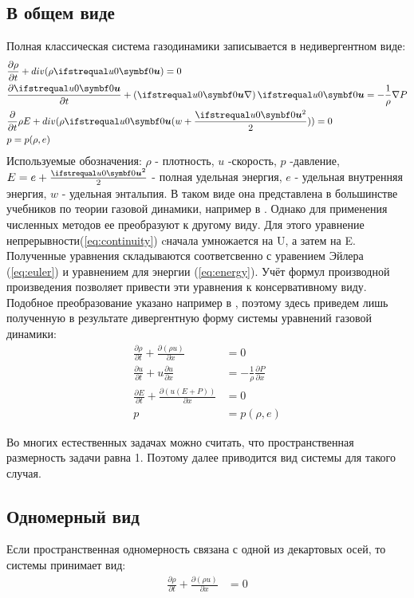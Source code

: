 \documentclass[a4paper,12pt]{extarticle}
\begin{document}
\subsection{В общем виде}
    Полная классическая система газодинамики записывается в недивергентном виде:
    \begin{align} 
        &\frac{\partial \rho}{\partial t} + div(\rho \vecxu) = 0 \label{eq:continuity}\\
        &\frac{\partial \vecxu}{\partial t} + \left(\vecxu \nabla \right)\vecxu = -\frac{1}{\rho}\nabla P  \label{eq:euler}	\\
        &\frac{\partial }{\partial t}\rho E + div(\rho \vecxu (w+\frac{\vecxu^2}{2})) = 0  \label{eq:energy} \\
        &p = p(\rho,e)
    \end{align}
    Используемые обозначения: $\rho$ - плотность, $u$ -скорость, $p$ -давление, $E = e + \frac{\vecxu^2}{2}$ - полная удельная энергия, $e$ - удельная внутренняя энергия, $w$ - удельная энтальпия.
    В таком виде она представлена в большинстве учебников по теории газовой динамики, например в \cite{godunov1976}. 
    Однако для применения численных методов ее преобразуют к другому виду. Для этого уравнение непрерывности(\ref{eq:continuity}) cначала умножается на U, а затем на E. Полученные уравнения складываются соответсвенно с уравением Эйлера (\ref{eq:euler}) и уравнением для энергии (\ref{eq:energy}). Учёт формул производной произведения позволяет привести эти уравнения к консервативному виду. Подобное преобразование указано например в \cite{MolchanovGasdynamics2013}, поэтому здесь приведем лишь полученную в результате дивергентную форму системы уравнений газовой динамики: 
    \begin{align}
        \frac{\partial \rho}{\partial t} + \frac{\partial (\rho u)}{\partial x} &= 0 \\
        \frac{\partial u}{\partial t} + u \frac{\partial u}{\partial x} &= - \frac{1}{\rho} \frac{\partial P}{\partial x} \\
        \frac{\partial E}{\partial t} + \frac{\partial (u(E + P))}{\partial x} &= 0 \\
        p &= p(\rho, e)
    \end{align}

    Во многих естественных задачах можно считать, что пространственная размерность задачи равна 1. Поэтому далее приводится вид системы для такого случая. 
\subsection{Одномерный вид}
    Если пространственная одномерность связана с одной из декартовых осей, то системы принимает вид:
    \begin{align}
        \frac{\partial \rho}{\partial t} + \frac{\partial (\rho u)}{\partial x} &= 0
    \end{align}
\end{document}

